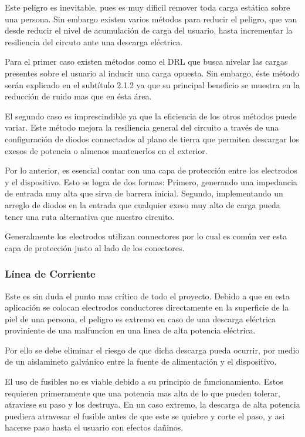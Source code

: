 \documentclass[11pt]{article}
\begin{document}
Este peligro es inevitable, pues es muy dificil remover toda carga estática sobre una persona. Sin embargo existen varios métodos para reducir el peligro, que van desde reducir el nivel de acumulación de carga del usuario, hasta incrementar la resiliencia del circuto ante una descarga eléctrica.

Para el primer caso existen métodos como el DRL que busca nivelar las cargas presentes sobre el usuario al inducir una carga opuesta. Sin embargo, éste método serán explicado en el subtítulo 2.1.2 ya que su principal beneficio se muestra en la reducción de ruido mas que en ésta área.

El segundo caso es imprescindible ya que la eficiencia de los otros métodos puede variar. Este método mejora la resiliencia general del circuito a través de una configuración de diodos connectados al plano de tierra que permiten descargar los exesos de potencia o almenos mantenerlos en el exterior.

Por lo anterior, es esencial contar con una capa de protección entre los electrodos y el dispositivo. Esto se logra de dos formas: Primero, generando una impedancia de entrada muy alta que sirva de barrera inicial. Segundo, implementando un arreglo de diodos en la entrada que cualquier exeso muy alto de carga pueda tener una ruta alternativa que nuestro circuito.

Generalmente los electrodos utilizan connectores por lo cual es común ver esta capa de protección justo al lado de los conectores.

\subsubsection{Línea de Corriente}
\label{sec:org143c564}
Este es sin duda el punto mas crítico de todo el proyecto. Debido a que en esta aplicación se colocan electrodos conductores directamente en la superficie de la piel de una persona, el peligro es extremo en caso de una descarga eléctrica proviniente de una malfuncion en una linea de alta potencia eléctrica.

Por ello se debe eliminar el riesgo de que dicha descarga pueda ocurrir, por medio de un aislamineto galvánico entre la fuente de alimentación y el dispositivo.

El uso de fusibles no es viable debido a su principio de funcionamiento. Estos requieren primeramente que una potencia mas alta de lo que pueden tolerar, atraviese su paso y los destruya. En un caso extremo, la descarga de alta potencia puediera atravesar el fusible antes de que este se quiebre y corte el paso, y asi hacerse paso hasta el usuario con efectos dañinos.
\end{document}
